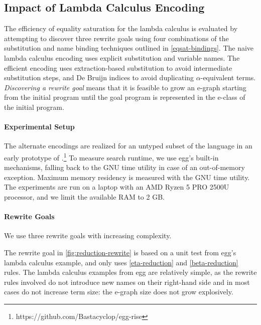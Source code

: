 \subsection{Impact of Lambda Calculus Encoding}
\label{lambda-eval}

The efficiency of equality saturation for the lambda calculus is evaluated by attempting to discover three rewrite goals using four combinations of the substitution and name binding techniques outlined in \cref{eqsat-bindings}.
The naive lambda calculus encoding uses explicit substitution and variable names.
The efficient encoding uses extraction-based substitution to avoid intermediate substitution steps, and De Bruijn indices to avoid duplicating $\alpha$-equivalent terms.
\emph{Discovering a rewrite goal} means that it is feasible to grow an e-graph starting from the initial program until the goal program is represented in the e-class of the initial program.

\paragraph{Experimental Setup}
The alternate encodings are realized for an untyped subset of the \Rise{} language in an early prototype of \kles{}.\footnote{https://github.com/Bastacyclop/egg-rise}
To measure search runtime, we use egg's built-in mechanisms, falling back to the GNU time utility in case of an out-of-memory exception.
Maximum memory residency is measured with  the GNU time utility.
The experiments are run on a laptop with an AMD Ryzen 5 PRO 2500U processor, and we limit the available RAM to 2 GB.

\paragraph{Rewrite Goals}
We use three rewrite goals with increasing complexity.

\def\reductionGoal {\goalStyle{reduction}}
The \reductionGoal{} rewrite goal in \cref{fig:reduction-rewrite} is based on a unit test from egg's lambda calculus example, and only uses \ref{eta-reduction} and \ref{beta-reduction} rules.
The lambda calculus examples from egg are relatively simple, as the rewrite rules involved do not introduce new names on their right-hand side and in most cases do not increase term size: the e-graph size does not grow explosively.

